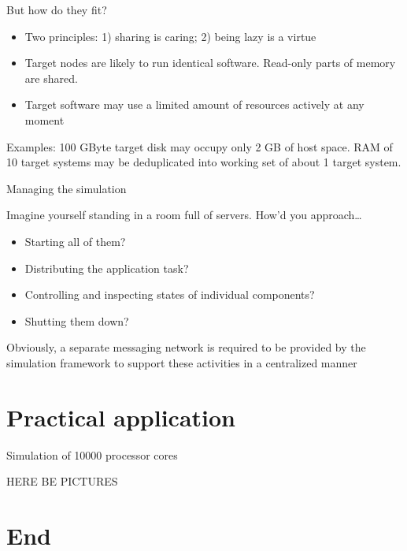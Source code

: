 \begin{frame}{But how do they fit?}

\begin{itemize}
\item Two principles: 1) sharing is caring; 2) being lazy is a virtue
\item Target nodes are likely to run identical software. Read-only parts of memory are shared.
\item Target software may use a limited amount of resources actively at any moment
\end{itemize}

Examples: 100 GByte target disk may occupy only 2 GB of host space. RAM of 10 target systems  may be deduplicated into working set of about 1 target system.

\end{frame}


\begin{frame}{Managing the simulation}

Imagine yourself standing in a room full of servers. How'd you approach…

\begin{itemize}
\item Starting all of them?
\item Distributing the application task?
\item Controlling and inspecting states of individual components?
\item Shutting them down?
\end{itemize}

Obviously, a separate messaging network is required to be provided by the simulation framework to support these activities in a centralized manner

\end{frame}


\section{Practical application}

\begin{frame}{Simulation of 10000 processor cores}

\Huge HERE BE PICTURES

\end{frame}



\section{End}

